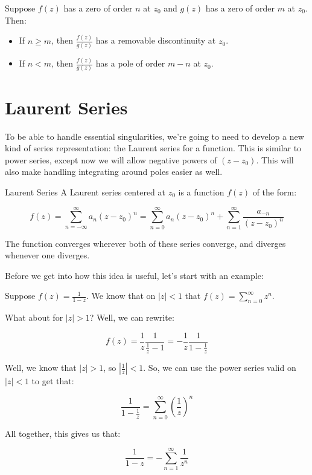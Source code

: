 \begin{thmbo}{}{} Suppose $f(z)$ has a zero of order $n$ at $z_0$ and $g(z)$ has a zero of order $m$ at $z_0$. Then:

\begin{itemize}
\item If $n \ge m$, then $\frac{f(z)}{g(z)}$ has a removable discontinuity at $z_0$.
\item If $n < m$, then $\frac{f(z)}{g(z)}$ has a pole of order $m-n$ at $z_0$.
\end{itemize}
\end{thmbo}

\section{Laurent Series}

To be able to handle essential singularities, we're going to need to develop a new kind of series representation: the Laurent series for a function. This is similar to power series, except now we will allow negative powers of $(z-z_0)$. This will also make handling integrating around poles easier as well.

\begin{defbo}{Laurent Series}{}
A Laurent series centered at $z_0$ is a function $f(z)$ of the form:

$$f(z) = \sum_{n = -\infty}^\infty a_n(z-z_0)^n = \sum_{n = 0}^\infty a_n(z-z_0)^n + \sum_{n = 1}^\infty \frac{a_{-n}}{(z-z_0)^n}$$

The function converges wherever both of these series converge, and diverges whenever one diverges.
\end{defbo}

Before we get into how this idea is useful, let's start with an example:

\begin{ex}{}{} Suppose $f(z) = \frac{1}{1-z}$. We know that on $|z| < 1$ that $f(z) = \sum_{n = 0}^\infty z^n$.

What about for $|z| > 1$? Well, we can rewrite:

$$f(z) = \frac{1}{z}\frac{1}{\frac{1}{z} - 1} = -\frac{1}{z}\frac{1}{1-\frac{1}{z} }$$

Well, we know that $|z| > 1$, so $\left|\frac{1}{z}\right| < 1$. So, we can use the power series valid on $|z| < 1$ to get that:

$$\frac{1}{1- \frac{1}{z}} = \sum_{n = 0}^\infty \left(\frac{1}{z}\right)^n$$

All together, this gives us that:

$$\frac{1}{1-z} = -\sum_{n = 1}^\infty \frac{1}{z^n}$$

\end{ex}

